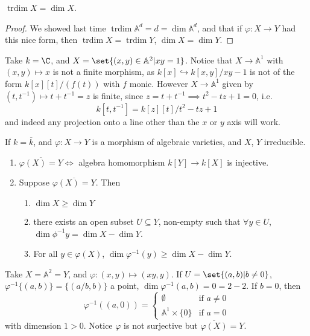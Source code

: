 \documentclass{article}
\newcommand{\A}{\mathbb{A}}
\DeclareMathOperator{\trdim}{trdim}
\begin{document}
\begin{cor}
    $\trdim X = \dim X$.
\end{cor}
\begin{proof}
    We showed last time $\trdim \A^d = d = \dim \A^d$, and that if $\varphi: X \to Y$ had this nice form, then $\trdim X = \trdim Y$, $\dim X = \dim Y$.
\end{proof}
\begin{eg}
    Take $k = \C$, and $X = \set{(x, y) \in \A^2 | x y = 1}$. Notice that $X \to \A^1$ with $(x, y) \mapsto x$ is not a finite morphism, as $k[x] \hookrightarrow k[x, y] /xy-1$ is not of the form $k[x][t]/(f(t))$ with $f$ monic.
    However $X \to \A^1$ given by $(t, t^{-1}) \mapsto t + t^{-1} = z$ is finite, since $z = t+t^{-1} \implies t^2 - tz + 1 = 0$, i.e.\
    \begin{equation}
        k[t, t^{-1}] = k[z][t]/t^2-tz+1
    \end{equation}
    and indeed any projection onto a line other than the $x$ or $y$ axis will work.
\end{eg}
\begin{thm}
    If $k = \overline{k}$, and $\varphi: X \to Y$ is a morphism of algebraic varieties, and $X$, $Y$ irreducible.
    \begin{enumerate}[label=(\alph*)]
        \item $\overline{\varphi(X) = Y} \iff$ algebra homomorphism $k[Y] \to k[X]$ is injective.
        \item Suppose $\overline{\varphi(X) = Y}$. Then
            \begin{enumerate}[label=(\roman*)]
                \item $\dim X \geq \dim Y$
                \item there exists an open subset $U \subseteq Y$, non-empty such that $\forall y \in U$, $\dim \phi^{-1} y = \dim X - \dim Y$.
                \item For all $y \in \varphi(X)$, $\dim \varphi^{-1}(y) \geq \dim X - \dim Y$.
            \end{enumerate}
    \end{enumerate}
\end{thm}
\begin{eg}
    Take $X = \A^2 = Y$, and $\varphi: (x, y) \mapsto (xy, y)$.
    If $U = \set{(a, b) | b \neq 0}$, $\varphi^{-1}\{(a, b)\} = \{(a/b, b)\}$ a point, $\dim \varphi^{-1}(a, b) = 0 = 2- 2$.
    If $b = 0$, then
    \begin{equation}
        \varphi^{-1}((a, 0)) =
        \begin{cases}
            \emptyset & \text{if } a \neq 0 \\
            \A^1 \times \{0\} & \text{if } a = 0
        \end{cases}
    \end{equation}
    with dimension $1 > 0$. Notice $\varphi$ is not surjective but $\overline{\varphi(X)} = Y$.
\end{eg}
\end{document}

